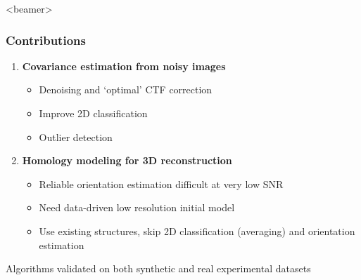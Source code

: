 \documentclass{beamer}
\begin{document}
\begin{frame}<beamer>
\frametitle{Contributions}
\begin{enumerate}
\item \textbf{Covariance estimation from noisy images}
\begin{itemize}
\item Denoising and `optimal' CTF correction
\item Improve 2D classification
\item Outlier detection
\end{itemize}
\item \textbf{Homology modeling for 3D reconstruction}
\begin{itemize}
\item Reliable orientation estimation difficult at very low SNR
\item Need data-driven low resolution initial model
\item Use existing structures, \alert{skip 2D classification (averaging) and orientation estimation}
\end{itemize}
\end{enumerate}
Algorithms validated on both synthetic and real experimental datasets
\end{frame}
\end{document}
